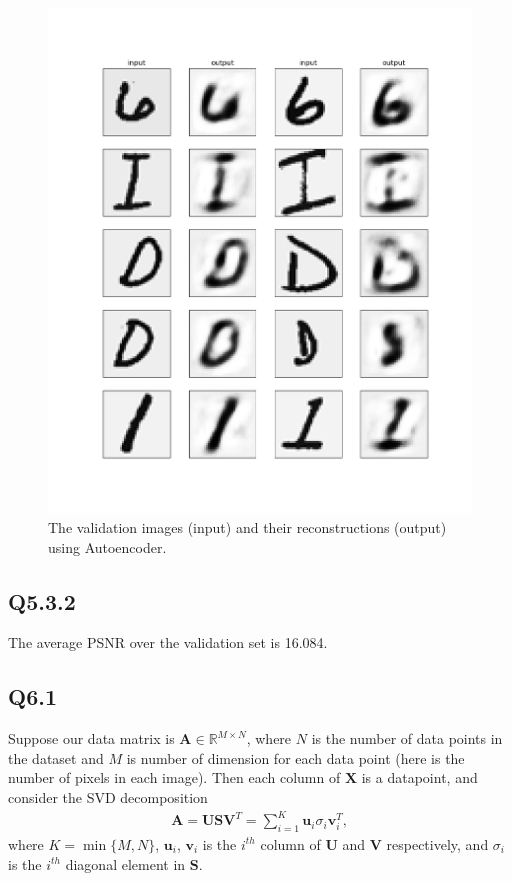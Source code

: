 \documentclass[11pt]{article}
\begin{document}
\begin{figure}[h!]
    \centering
    \includegraphics[width=.8\linewidth]{../results/q5_3_1.png}
    \caption{The validation images (input) and their reconstructions (output) using Autoencoder. }
    \label{fig:q5.3.1}
\end{figure}

\newpage

\subsection*{Q5.3.2}

The average PSNR over the validation set is 16.084.

\newpage

\subsection*{Q6.1}

\newcommand{\bX}{\mathbf{X}}
\newcommand{\bA}{\mathbf{A}}
\newcommand{\bC}{\mathbf{C}}
\newcommand{\bU}{\mathbf{U}}
\newcommand{\bu}{\mathbf{u}}
\newcommand{\bV}{\mathbf{V}}
\newcommand{\bv}{\mathbf{v}}
\newcommand{\bS}{\mathbf{S}}

Suppose our data matrix is $\bA \in \mathbb{R}^{M\times N}$, where $N$ is the number of data points in the dataset and $M$ is number of dimension for each data point (here is the number of pixels in each image). Then each column of $\bX$ is a datapoint, and consider the SVD decomposition
\begin{align} \label{eq:SVD}
  \bA = \bU\bS\bV^T  = \sum_{i=1}^K \bu_i \sigma_i \bv_i^T,
\end{align}
where $K=\min\{M, N\}$, $\bu_i$, $\bv_i$ is the $i^{th}$ column of $\bU$ and $\bV$ respectively,
and $\sigma_i$ is the $i^{th}$ diagonal element in $\bS$.
\end{document}
